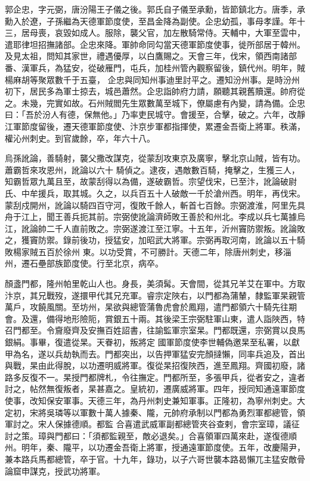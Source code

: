 \begin{pinyinscope}
 郭企忠，字元弼，唐汾陽王子儀之後。郭氏自子儀至承勳，皆節鎮北方。唐季，承勳入於遼，子孫繼為天德軍節度使，至昌金降為副使。企忠幼孤，事母孝謹。年十三，居母喪，哀毀如成人。服除，襲父官，加左散騎常侍。天輔中，大軍至雲中，遣耶律坦招撫諸部。企忠來降。軍帥命同勾當天德軍節度使事，徙所部居于韓州。及見太祖，問知其家世，禮遇優厚，以白鷹賜之。天會三年，伐宋，領西南諸部番、漢軍兵，為猛安，從破雁門，屯兵，加桂州管內觀察留後，鎮代州。明年，賊楊麻胡等聚眾數千于五臺，
 企忠與同知州事迪里討平之。遷知汾州事。是時汾州初下，居民多為軍士掠去，城邑蕭然。企忠詣帥府力請，願聽其親舊贖還。帥府從之。未幾，完實如故。石州賊閻先生眾數萬至城下，僚屬慮有內變，請為備。企忠曰：「吾於汾人有德，保無他。」乃率吏民城守。會援至，合擊，破之。六年，改靜江軍節度留後，遷天德軍節度使、汴京步軍都指揮使，累遷金吾衛上將軍。秩滿，權沁州刺史。到官歲餘，卒，年六十八。



 烏孫訛論，善騎射，襲父撒改謀克，從蒙刮攻東京及廣寧，擊北京山賊，皆有功。蕭霸哲來攻恩州，訛論以六十
 騎偵之。逮夜，遇敵數百騎，掩擊之，生獲三人，知霸哲眾九萬且至，故蒙刮得以為備，遂破霸哲。宗望伐宋，已至汴，訛論破尉氏、中牟援兵，取其城。久之，以兵百五十人破敵一千於滄州西。明年，再伐宋。蒙刮戍開州，訛論以騎四百守河，復敗千餘人，斬首七百餘。宗弼渡淮，阿里先具舟于江上，聞王善兵扼其前。宗弼使訛論濟師敗王善於和州北。李成以兵七萬據烏江，訛論帥二千人直前敗之。宗弼遂渡江至江寧。十五年，沂州竇防禦叛。訛論敗之，獲竇防禦。錄前後功，授猛安，加昭武大將軍。宗弼再取河南，訛論以五十騎敗楊家賊五百於徐州
 東。以功受賞，不可勝計。天德二年，除唐州刺史，移淄州，遷石壘部族節度使。行至北京，病卒。



 顏盞門都，隆州帕里乾山人也。身長，美須髯。天會間，從其兄羊艾在軍中。方取汴京，其兄戰歿，遂擐甲代其兄充軍。睿宗定陜右，以門都為蒲輦，隸監軍杲親管萬戶，攻饒風關。至坊州，杲欲與總管蒲魯虎會於鳳翔，遣門都領六十騎先往期會。及還，備得地形險阨，賞銀五十兩。其後梁王宗弼駐軍山東，遣人詣陜西，特召門都至。令齎廢齊及安撫百姓詔書，往諭監軍宗室杲。門都既還，宗弼賞以良馬銀絹。事畢，復遣從杲。天眷初，叛將定
 國軍節度使李世輔偽邀杲至私署，以獻甲為名，遂以兵劫執而去。門都突出，以告押軍猛安完顏撻懶，同率兵追及，首出與戰，杲由此得脫，以功遷明威將軍。復從杲招復陜西，進至鳳翔。齊國初廢，諸路多反復不一。杲授門都牌札，令往撫定。門都所至，多張甲兵，從者安之，違者討之，帖然無復叛者，杲甚嘉之。皇統初，遷廣威將軍。四年，授同知通遠軍節度使事，改知保安軍事。天德三年，為丹州刺史兼知軍事。正隆初，為寧州刺史。大定初，宋將吳璘等以軍數十萬人據秦、隴，元帥府承制以門都為勇烈軍都總管，領軍討之。宋人保據德順。都監
 合喜遣武威軍副都總管夾谷查剌，會宗室璋，議征討之策。璋與門都曰：「須都監親至，敵必退矣。」合喜領軍四萬來赴，遂復德順州。明年，秦、隴平，以功遷金吾衛上將軍，授通遠軍節度使。五年，改慶陽尹，兼本路兵馬都總管，卒于官。十九年，錄功，以子六哥世襲本路曷懶兀主猛安敵骨論窟申謀克，授武功將軍。




\end{pinyinscope}
